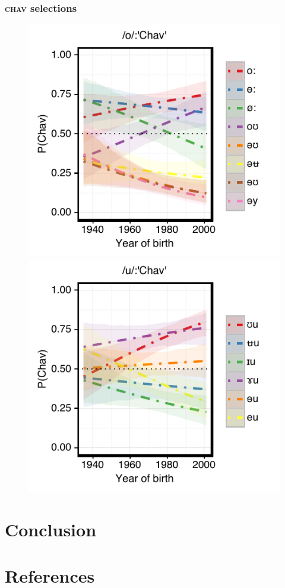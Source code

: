 \documentclass[PWPL]{article}
\begin{document}
\subsubsection{\textsc{chav} selections}
\begin{figure}[H]
\centering
\includegraphics[scale=0.8]{ow_chav_age.pdf}
\includegraphics[scale=0.8]{uw_chav_age.pdf}
\end{figure}
\section{Conclusion}
\section{References}

\nocite{*}

\end{document}
